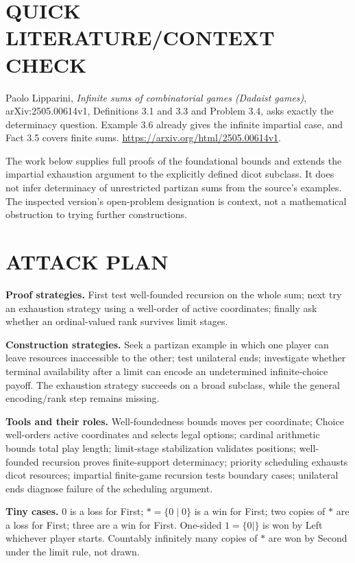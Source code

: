 \documentclass[11pt,a4paper]{article}
\theoremstyle{definition}\newtheorem{definition}[theorem]{Definition}
\theoremstyle{remark}\newtheorem{remark}[theorem]{Remark}
\newcommand{\1}{\mathbf 1}
\begin{document}
\section{QUICK LITERATURE/CONTEXT CHECK}
Paolo Lipparini, \emph{Infinite sums of combinatorial games (Dadaist games)}, arXiv:2505.00614v1, Definitions 3.1 and 3.3 and Problem 3.4, asks exactly the determinacy question. Example 3.6 already gives the infinite impartial case, and Fact 3.5 covers finite sums. \url{https://arxiv.org/html/2505.00614v1}.

The work below supplies full proofs of the foundational bounds and extends the impartial exhaustion argument to the explicitly defined dicot subclass. It does not infer determinacy of unrestricted partizan sums from the source's examples. The inspected version's open-problem designation is context, not a mathematical obstruction to trying further constructions.

\section{ATTACK PLAN}
\textbf{Proof strategies.} First test well-founded recursion on the whole sum; next try an exhaustion strategy using a well-order of active coordinates; finally ask whether an ordinal-valued rank survives limit stages.

\textbf{Construction strategies.} Seek a partizan example in which one player can leave resources inaccessible to the other; test unilateral ends; investigate whether terminal availability after a limit can encode an undetermined infinite-choice payoff. The exhaustion strategy succeeds on a broad subclass, while the general encoding/rank step remains missing.

\textbf{Tools and their roles.} Well-foundedness bounds moves per coordinate; Choice well-orders active coordinates and selects legal options; cardinal arithmetic bounds total play length; limit-stage stabilization validates positions; well-founded recursion proves finite-support determinacy; priority scheduling exhausts dicot resources; impartial finite-game recursion tests boundary cases; unilateral ends diagnose failure of the scheduling argument.

\textbf{Tiny cases.} $0$ is a loss for First; $*=\{0\mid0\}$ is a win for First; two copies of $*$ are a loss for First; three are a win for First. One-sided $1=\{0\mid\}$ is won by Left whichever player starts. Countably infinitely many copies of $*$ are won by Second under the limit rule, not drawn.
\end{document}
